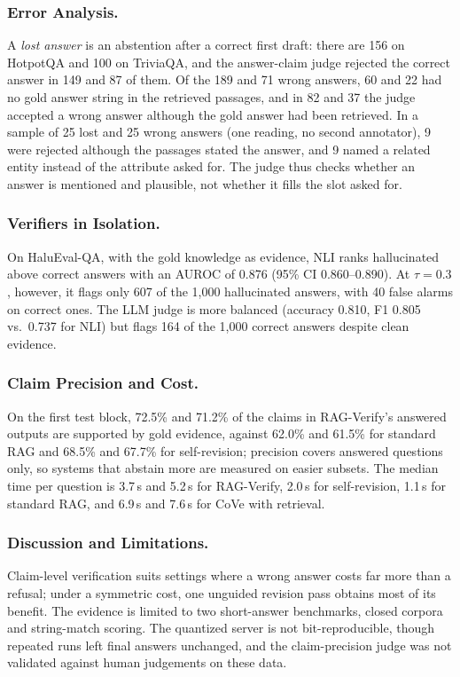 \documentclass{svproc}
\begin{document}
\subsubsection{Error Analysis.} A \emph{lost answer} is an abstention after a correct first draft: there are 156 on HotpotQA and 100 on TriviaQA, and the answer-claim judge rejected the correct answer in 149 and 87 of them. Of the 189 and 71 wrong answers, 60 and 22 had no gold answer string in the retrieved passages, and in 82 and 37 the judge accepted a wrong answer although the gold answer had been retrieved. In a sample of 25 lost and 25 wrong answers (one reading, no second annotator), 9 were rejected although the passages stated the answer, and 9 named a related entity instead of the attribute asked for. The judge thus checks whether an answer is mentioned and plausible, not whether it fills the slot asked for.

\subsubsection{Verifiers in Isolation.} On HaluEval-QA, with the gold knowledge as evidence, NLI ranks hallucinated above correct answers with an AUROC of 0.876 (95\% CI 0.860--0.890). At $\tau=0.3$, however, it flags only 607 of the 1{,}000 hallucinated answers, with 40 false alarms on correct ones. The LLM judge is more balanced (accuracy 0.810, F1 0.805 vs.\ 0.737 for NLI) but flags 164 of the 1{,}000 correct answers despite clean evidence.

\subsubsection{Claim Precision and Cost.} On the first test block, 72.5\% and 71.2\% of the claims in RAG-Verify's answered outputs are supported by gold evidence, against 62.0\% and 61.5\% for standard RAG and 68.5\% and 67.7\% for self-revision; precision covers answered questions only, so systems that abstain more are measured on easier subsets. The median time per question is 3.7\,s and 5.2\,s for RAG-Verify, 2.0\,s for self-revision, 1.1\,s for standard RAG, and 6.9\,s and 7.6\,s for CoVe with retrieval.

\subsubsection{Discussion and Limitations.} Claim-level verification suits settings where a wrong answer costs far more than a refusal; under a symmetric cost, one unguided revision pass obtains most of its benefit. The evidence is limited to two short-answer benchmarks, closed corpora and string-match scoring. The quantized server is not bit-reproducible, though repeated runs left final answers unchanged, and the claim-precision judge was not validated against human judgements on these data.
\end{document}
